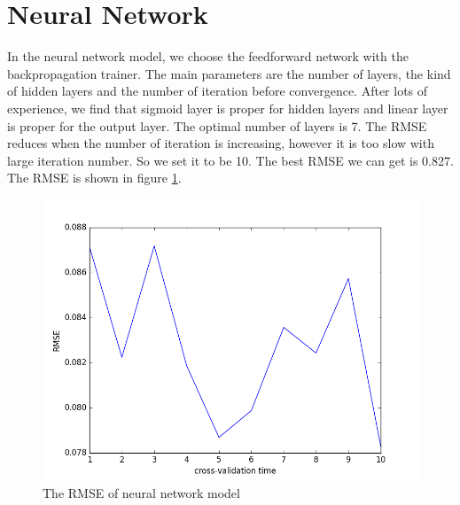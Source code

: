 \documentclass{article}
\begin{document}
\section{Neural Network}
In the neural network model, we choose the feedforward network with the backpropagation trainer. The main parameters are the number of layers, the kind of hidden layers and the number of iteration before convergence. After lots of experience, we find that sigmoid layer is proper for hidden layers and linear layer is proper for the output layer. The optimal number of layers is 7. The RMSE reduces when the number of iteration is increasing, however it is too slow with large iteration number. So we set it to be 10. The best RMSE we can get is 0.827. The RMSE is shown in figure \ref{fig:nn}.
\begin{figure}[htbp]
\centering
\includegraphics[width=.6\textwidth]{nn.png}
\caption{The RMSE of neural network model}
\label{fig:nn}
\end{figure}
\end{document}
